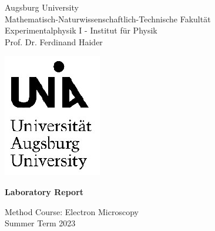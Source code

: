 \thispagestyle{empty}


\begin{minipage}{0.825\textwidth}
	\vspace{20pt}
	Augsburg University\\
	Mathematisch-Naturwissenschaftlich-Technische Fakultät\\
	Experimentalphysik I - Institut für Physik\\
	Prof. Dr. Ferdinand Haider\\
\end{minipage}
\begin{minipage}{0.175\textwidth}
	\includegraphics[width=\textwidth]{pictures/Logo_Uni.eps}
\end{minipage}

\vspace{120pt}

\begin{center}
\huge \textbf{Laboratory Report}\\

\vspace{120pt}

\Large Method Course: Electron Microscopy\\
\Large Summer Term 2023
\end{center}

